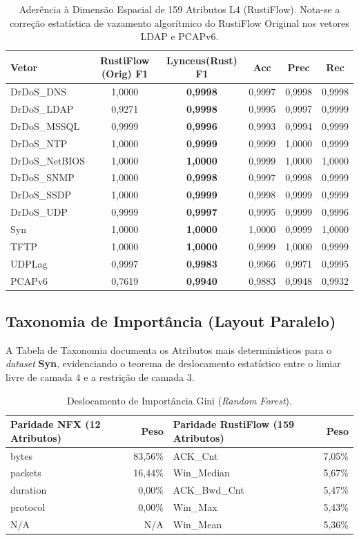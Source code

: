 \documentclass[11pt,a4paper]{article}
\begin{document}
\begin{table}[H]
\centering
\begin{tabular}{l|c|cccc}
\toprule
\textbf{Vetor} & \textbf{RustiFlow (Orig) F1} & \textbf{Lynceus(Rust) F1} & \textbf{Acc} & \textbf{Prec} & \textbf{Rec} \\
\midrule
DrDoS\_DNS & 1,0000 & \textbf{0,9998} & 0,9997 & 0,9998 & 0,9998 \\
DrDoS\_LDAP & 0,9271 & \textbf{0,9998} & 0,9995 & 0,9997 & 0,9999 \\
DrDoS\_MSSQL & 0,9999 & \textbf{0,9996} & 0,9993 & 0,9994 & 0,9999 \\
DrDoS\_NTP & 1,0000 & \textbf{0,9999} & 0,9999 & 1,0000 & 0,9999 \\
DrDoS\_NetBIOS & 1,0000 & \textbf{1,0000} & 0,9999 & 1,0000 & 1,0000 \\
DrDoS\_SNMP & 1,0000 & \textbf{0,9998} & 0,9997 & 0,9998 & 0,9999 \\
DrDoS\_SSDP & 1,0000 & \textbf{0,9999} & 0,9998 & 0,9999 & 0,9999 \\
DrDoS\_UDP & 0,9999 & \textbf{0,9997} & 0,9995 & 0,9999 & 0,9996 \\
Syn & 1,0000 & \textbf{1,0000} & 1,0000 & 0,9999 & 1,0000 \\
TFTP & 1,0000 & \textbf{1,0000} & 0,9999 & 1,0000 & 0,9999 \\
UDPLag & 0,9997 & \textbf{0,9983} & 0,9966 & 0,9971 & 0,9995 \\
PCAPv6 & 0,7619 & \textbf{0,9940} & 0,9883 & 0,9948 & 0,9932 \\
\bottomrule
\end{tabular}
\caption{Aderência à Dimensão Espacial de 159 Atributos L4 (RustiFlow). Nota-se a correção estatística de vazamento algorítmico do RustiFlow Original nos vetores LDAP e PCAPv6.}
\end{table}

\subsection{Taxonomia de Importância (Layout Paralelo)}

A Tabela de Taxonomia documenta os Atributos mais determinísticos para o \textit{dataset} \textbf{Syn}, evidenciando o teorema de deslocamento estatístico entre o limiar livre de camada 4 e a restrição de camada 3.

\begin{table}[H]
\centering
\begin{tabular}{lr|lr}
\toprule
\textbf{Paridade NFX (12 Atributos)} & \textbf{Peso} & \textbf{Paridade RustiFlow (159 Atributos)} & \textbf{Peso} \\
\midrule
bytes & 83,56\% & ACK\_Cnt & 7,05\% \\
packets & 16,44\% & Win\_Median & 5,67\% \\
duration & 0,00\% & ACK\_Bwd\_Cnt & 5,47\% \\
protocol & 0,00\% & Win\_Max & 5,43\% \\
N/A & N/A & Win\_Mean & 5,36\% \\
\bottomrule
\end{tabular}
\caption{Deslocamento de Importância Gini (\textit{Random Forest}).}
\end{table}
\end{document}
